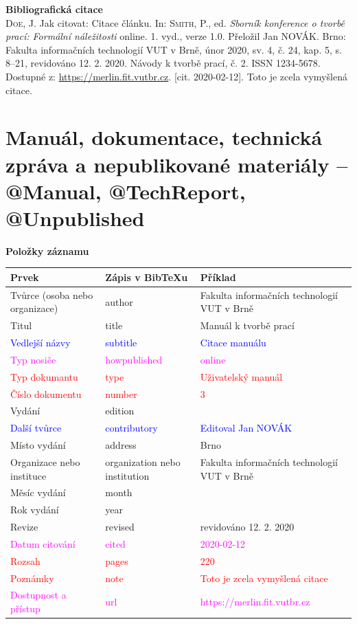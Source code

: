 \bigskip

\noindent \textbf{Bibliografická citace}\\
\textsc{Doe}, J. Jak citovat: Citace článku.
In: \textsc{Smith}, P., ed. \textit{Sborník konference o tvorbě prací: Formální náležitosti} online. 1. vyd., verze 1.0. Přeložil Jan NOVÁK. Brno: Fakulta informačních technologií VUT v Brně, únor 2020, sv. 4, č. 24, kap. 5, s. 8–21, revidováno 12. 2. 2020. Návody k tvorbě prací, č. 2. ISSN 1234-5678. Dostupné z: \url{https://merlin.fit.vutbr.cz}. [cit. 2020-02-12]. Toto je zcela vymyšlená citace.
\newpage
\section*{Manuál, dokumentace, technická zpráva a nepublikované materiály -- @Manual, @TechReport, @Unpublished}
\label{pr-manual}
\noindent \textbf{Položky záznamu}

\medskip

\begin{tabularx}{0.95\linewidth}{X X >{\raggedright\arraybackslash}X}
    Prvek & Zápis v BibTeXu & Příklad\\\hline
    Tvůrce (osoba nebo organizace) & author & Fakulta informačních technologií VUT v Brně\\
    Titul & title & Manuál k tvorbě prací\\
    \textcolor{blue}{Vedlejší názvy} & \textcolor{blue}{subtitle} & \textcolor{blue}{Citace manuálu}\\
    \textcolor{magenta}{Typ nosiče} & \textcolor{magenta}{howpublished} & \textcolor{magenta}{online}\\
    \textcolor{red}{Typ dokumantu} & \textcolor{red}{type} & \textcolor{red}{Uživatelský manuál}\\
    \textcolor{red}{Číslo dokumentu} & \textcolor{red}{number} & \textcolor{red}{3}\\
    Vydání & edition & 1\\
    \textcolor{blue}{Další tvůrce} & \textcolor{blue}{contributory} & \textcolor{blue}{Editoval Jan NOVÁK}\\
    Místo vydání & address & Brno\\
    Organizace nebo instituce & organization nebo institution & Fakulta informačních technologií VUT v Brně\\
    Měsíc vydání & month & 2\\
    Rok vydání & year & 2020\\
    Revize & revised & revidováno 12. 2. 2020\\
    \textcolor{magenta}{Datum citování} & \textcolor{magenta}{cited} & \textcolor{magenta}{2020-02-12}\\
    \textcolor{red}{Rozsah} & \textcolor{red}{pages} & \textcolor{red}{220}\\   
    \textcolor{red}{Poznámky} & \textcolor{red}{note} & \textcolor{red}{Toto je zcela vymyšlená citace}\\
    \textcolor{magenta}{Dostupnost a přístup} & \textcolor{magenta}{url} & \textcolor{magenta}{https://merlin.fit.vutbr.cz}\\
\end{tabularx}

